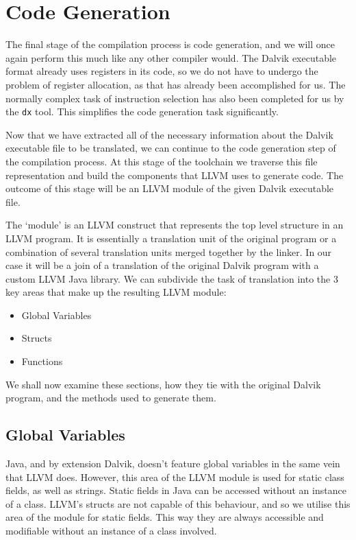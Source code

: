 \section{Code Generation}
\label{sec:codegen}

The final stage of the compilation process is code generation, and we will once again perform this much like any other compiler would. The Dalvik executable format already uses registers in its code, so we do not have to undergo the problem of register allocation, as that has already been accomplished for us. The normally complex task of instruction selection has also been completed for us by the \verb|dx| tool. This simplifies the code generation task significantly.

Now that we have extracted all of the necessary information about the Dalvik executable file to be translated, we can continue to the code generation step of the compilation process. At this stage of the toolchain we traverse this file representation and build the components that LLVM uses to generate code. The outcome of this stage will be an LLVM module of the given Dalvik executable file.

The `module' is an LLVM construct that represents the top level structure in an LLVM program. It is essentially a translation unit of the original program or a combination of several translation units merged together by the linker. In our case it will be a join of a translation of the original Dalvik program with a custom LLVM Java library. We can subdivide the task of translation into the 3 key areas that make up the resulting LLVM module:

\begin{itemize}
	\item Global Variables
	\item Structs
	\item Functions
\end{itemize}

We shall now examine these sections, how they tie with the original Dalvik program, and the methods used to generate them.

\subsection*{Global Variables}

Java, and by extension Dalvik, doesn't feature global variables in the same vein that LLVM does. However, this area of the LLVM module is used for static class fields, as well as strings. Static fields in Java can be accessed without an instance of a class. LLVM's structs are not capable of this behaviour, and so we utilise this area of the module for static fields. This way they are always accessible and modifiable without an instance of a class involved.

